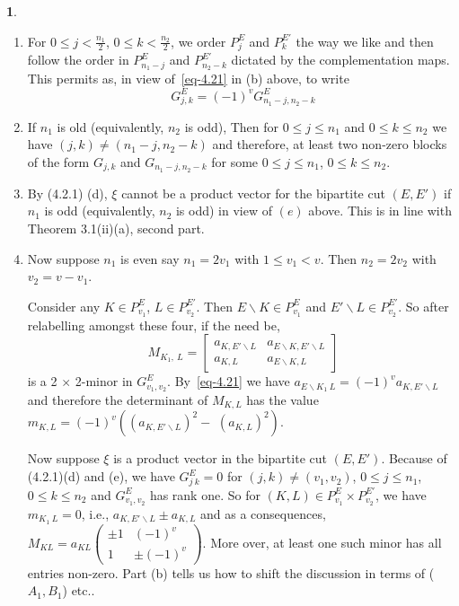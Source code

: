 \documentclass[a4paper,12pt]{article}
\theoremstyle{definition}
\theoremstyle{underlinethm}
\theoremstyle{definition}
\newtheorem{subsubsec}{}[subsection]
\begin{document}
\begin{subsubsec}
\begin{enumerate}[label=(\alph*)]
\item For $0 \leq j < \frac{n_{1}}{2}$, $0 \leq k < \frac{n_{2}}{2}$, we order $P_{j}^{E}$ and $P_{k}^{E'}$ the way we like and then follow the order in $P_{n_{1}-j}^{E}$ and $P_{n_{2}-k}^{E'}$ dictated by the complementation maps. This permits as, in view of~\eqref{eq-4.21} in (b) above, to write
\begin{equation}
G_{j,k}^{E} = (-1)^{v} G_{n_{1}-j, n_{2}-k}^{E} \tag{4.22}\label{eq-4.22}
\end{equation}

\item If $n_{1}$ is old (equivalently, $n_{2}$ is odd), Then for $0 \leq j \leq n_{1}$ and $0 \leq k \leq n_{2}$ we have $(j,k) \neq (n_{1}-j, n_{2}-k)$ and therefore, at least two non-zero blocks of the form $G_{j,k}$ and $G_{n_{1}-j, n_{2}-k}$ for some $0\leq j \leq n_{1}$, $0 \leq k \leq n_{2}$. 

\item By (4.2.1) (d), $\xi$ cannot be a product vector for the bipartite cut $(E, E')$ if $n_{1}$ is odd (equivalently, $n_{2}$ is odd) in view of $(e)$ above. This is in line with Theorem 3.1(ii)(a), second part.

\item Now suppose $n_{1}$ is even say $n_{1}=2v_{1}$ with $1 \leq v_{1} < v$. Then $n_{2}=2v_{2}$ with $v_{2}=v-v_{1}$.

Consider any $K \in P_{v_{1}}^{E}$, $L \in P_{v_{2}}^{E'}$. Then $E \smallsetminus K \in P_{v_{1}}^{E}$ and $E'\smallsetminus L \in P_{v_{2}}^{E'}$. So after relabelling amongst these four, if the need be,
\begin{equation*}
M_{K_{1},~L} = 
\begin{bmatrix}
a_{K,E' \smallsetminus L} &  a_{E \smallsetminus K, E'\smallsetminus L}\\ 
a_{K,L} & a_{E \smallsetminus K, L}\tag{4.23}\label{eq-4.23}
\end{bmatrix}
\end{equation*}
is a 2 $\times$ 2-minor in $G_{v_{1}, v_{2}}^{E}$. By~\eqref{eq-4.21} we have $a_{E \smallsetminus K_{1}~L} = (-1)^{v} a_{K, E'\smallsetminus L}$ and therefore the determinant of $M_{K, L}$ has the value $m_{K,L} = (-1)^{v} \left((a_{K, E' \smallsetminus L})^{2} -\right.$ $\left.(a_{K, L})^{2} \right)$.

Now suppose $\xi$ is a product vector in the bipartite cut $(E, E')$. Because of (4.2.1)(d) and (e), we have $G_{j~k}^{E}=0$ for $(j,k) \neq (v_{1}, v_{2}) $, $0 \leq j \leq n_{1}$, $0 \leq k \leq n_{2}$ and $G_{v_{1}, v_{2}}^{E}$ has rank one. So for $(K, L) \in P_{v_{1}}^{E} \times P_{v_{2}}^{E'}$, we have $m_{K_{1}~L} = 0$, i.e., $a_{K, E'\smallsetminus L} \pm a_{K, L} $ and as a consequences, $M_{KL}= a_{KL}\begin{pmatrix}\pm 1 & (-1)^{v} \\ 1 & \pm (-1)^{v}\end{pmatrix}$. More over, at least one such minor has all entries non-zero. Part (b) tells us how to shift the discussion in terms of ($A_{1}, B_{1}$) etc..


\end{enumerate}
\end{subsubsec}
\end{document}
